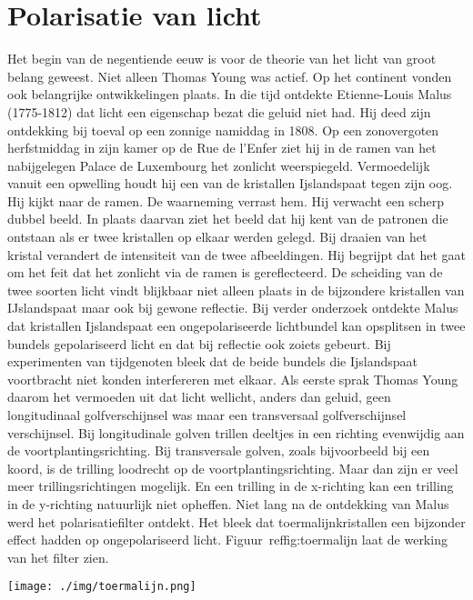 {\section{Polarisatie van licht}
Het begin van de negentiende eeuw is voor de theorie van het licht van groot belang geweest. Niet alleen Thomas Young was actief. Op het continent vonden ook belangrijke ontwikkelingen plaats. In die tijd ontdekte Etienne-Louis Malus (1775-1812) dat licht een eigenschap bezat die geluid niet had. Hij deed zijn ontdekking bij toeval op een zonnige namiddag in 1808.
Op een zonovergoten herfstmiddag in zijn kamer op de Rue de l'Enfer ziet hij in de ramen van het nabijgelegen Palace de Luxembourg het zonlicht weerspiegeld. Vermoedelijk vanuit een opwelling houdt hij een van de kristallen Ijslandspaat tegen zijn oog. Hij kijkt naar de ramen. De waarneming verrast hem. Hij verwacht een scherp dubbel beeld. In plaats daarvan ziet het beeld dat hij kent van de patronen die ontstaan als er twee kristallen op elkaar werden gelegd. Bij draaien van het kristal verandert de intensiteit van de twee afbeeldingen. Hij begrijpt dat het gaat om het feit dat het zonlicht via de ramen is gereflecteerd. De scheiding van de twee soorten licht vindt blijkbaar niet alleen plaats in de bijzondere kristallen van IJslandspaat maar ook bij gewone reflectie. 
Bij verder onderzoek ontdekte Malus dat kristallen Ijslandspaat een ongepolariseerde lichtbundel kan opsplitsen in twee bundels gepolariseerd licht en dat bij reflectie ook zoiets gebeurt. Bij experimenten van tijdgenoten bleek dat de beide bundels die Ijslandspaat voortbracht niet konden interfereren met elkaar. Als eerste sprak Thomas Young daarom het vermoeden uit dat licht wellicht, anders dan geluid, geen longitudinaal golfverschijnsel was maar een transversaal golfverschijnsel verschijnsel. Bij longitudinale golven trillen deeltjes in een richting evenwijdig aan de voortplantingsrichting. Bij transversale golven, zoals bijvoorbeeld bij een koord, is de trilling loodrecht op de voortplantingsrichting. Maar dan zijn er veel meer trillingsrichtingen mogelijk. En een trilling in de x-richting kan een trilling in de y-richting natuurlijk niet opheffen. 
Niet lang na de ontdekking van Malus werd het polarisatiefilter ontdekt. Het bleek dat toermalijnkristallen een bijzonder effect hadden op ongepolariseerd licht. Figuur~ref{fig:toermalijn} laat de werking van het filter zien. 

\begin{center}
\leavevmode
\texttt{[image: ./img/toermalijn.png]}
\end{center}

}

